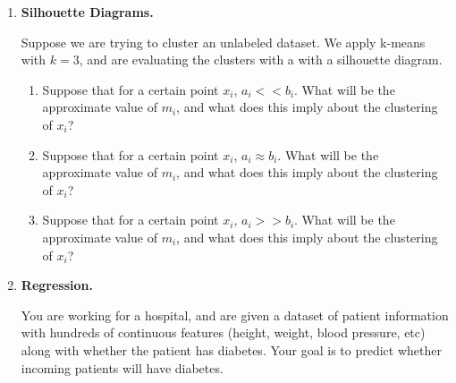 \documentclass[11pt]{article}
\newif\ifsol
\begin{document}
\begin{enumerate}


\item{{\bf{Silhouette Diagrams.}}}

Suppose we are trying to cluster an unlabeled dataset. We apply k-means with $k = 3$, and are evaluating the clusters with a with a silhouette diagram.
\begin{enumerate}
    \item Suppose that for a certain point $x_i$, $a_i << b_i$. What will be the approximate value of $m_i$, and what does this imply about the clustering of $x_i$? \\
    \ifsol
        {\color{blue} If $a_i$ is small relative to $b_i$, this is a good clustering of $x_i$, since it is (on average) much closer to points in its own cluster than the next best cluster. The measure $m_i$ will be close to 1.}
    \else
        \vspace{1cm}
    \fi
    \item Suppose that for a certain point $x_i$, $a_i \approx b_i$. What will be the approximate value of $m_i$, and what does this imply about the clustering of $x_i$? \\
    \ifsol
        {\color{blue} If $a_i$ is similar to $b_i$, this is not a very good clustering of $x_i$, since it is about the same distance away from points in its own cluster as those in the next best cluster. The measure $m_i$ will be close to 0.}
    \else
        \vspace{1cm}
    \fi
    \item Suppose that for a certain point $x_i$, $a_i >> b_i$. What will be the approximate value of $m_i$, and what does this imply about the clustering of $x_i$? \\
    \ifsol
        {\color{blue} If $a_i$ is much greater than $b_i$, this is an incorrect clustering of $x_i$, since it is much farther from points in its own cluster as those in the next best cluster (this situation should be impossible with k-means). The measure $m_i$ will be close to -1.}
    \else
        \vspace{1cm}
    \fi
\end{enumerate}


\item{{\bf{Regression.}}}

You are working for a hospital, and are given a dataset of patient information with hundreds of continuous features (height, weight, blood pressure, etc) along with whether the patient has diabetes. Your goal is to predict whether incoming patients will have diabetes.


\end{enumerate}
\end{document}
